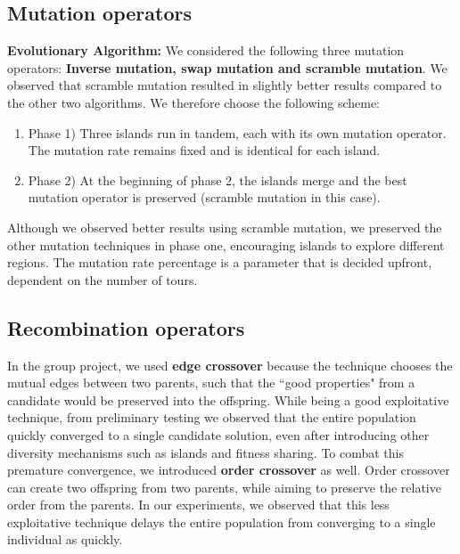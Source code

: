 \documentclass[a4paper,10pt]{article}
\newcommand{\ReplaceMe}[1]{{\color{blue}#1}}
\begin{document}
		

	
	
	

\subsection{Mutation operators}
	\textbf{Evolutionary Algorithm:}
	We considered the following three mutation operators: \textbf{Inverse mutation, swap mutation and scramble mutation}. We observed that scramble mutation resulted in slightly better results compared to the other two algorithms. We therefore choose the following scheme: 
	\begin{enumerate}
		\item Phase 1) Three islands run in tandem, each with its own mutation operator. The mutation rate remains fixed and is identical for each island.
		\item Phase 2) At the beginning of phase 2, the islands merge and the best mutation operator is preserved (scramble mutation in this case).
	\end{enumerate}
	Although we observed better results using scramble mutation, we preserved the other mutation techniques in phase one, encouraging islands to explore different regions. The mutation rate percentage is a parameter that is decided upfront, dependent on the number of tours.
	


\subsection{Recombination operators}
	In the group project, we used \textbf{edge crossover} because the technique chooses the mutual edges between two parents, such that the ``good properties" from a candidate would be preserved into the offspring. While being a good exploitative technique, from preliminary testing we observed that the entire population quickly converged to a single candidate solution, even after introducing other diversity mechanisms such as islands and fitness sharing. To combat this premature convergence, we introduced \textbf{order crossover} as well. Order crossover can create two offspring from two parents, while aiming to preserve the relative order from the parents. In our experiments, we observed that this less exploitative technique delays the entire population from converging to a single individual as quickly.
	
\end{document}
